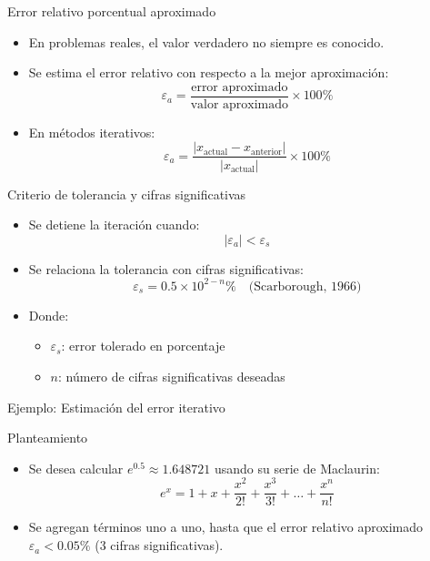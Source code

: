 \documentclass[main.tex]{subfiles}
\begin{document}
\begin{frame}[c]{Error relativo porcentual aproximado}
\begin{itemize}
  \item En problemas reales, el valor verdadero no siempre es conocido.
  \item Se estima el error relativo con respecto a la mejor aproximación:
  \[
\boxed{  \varepsilon_a = \frac{\text{error aproximado}}{\text{valor aproximado}} \times 100\%}
  \]
  \item En métodos iterativos:
  \[
\boxed{\varepsilon_a = \frac{|x_{\text{actual}} - x_{\text{anterior}}|}{|x_{\text{actual}}|} \times 100\%}
  \]
\end{itemize}
\end{frame}

\begin{frame}[c]{Criterio de tolerancia y cifras significativas}
\begin{itemize}
  \item Se detiene la iteración cuando:
  \[
\boxed{  |\varepsilon_a| < \varepsilon_s}
  \]
  \item Se relaciona la tolerancia con cifras significativas:
  \[
  \boxed{ \varepsilon_s = 0.5 \times 10^{2 - n}\%} \quad \text{(Scarborough, 1966)}
  \]
  \item Donde:
  \begin{itemize}
    \item \(\varepsilon_s\): error tolerado en porcentaje
    \item \(n\): número de cifras significativas deseadas
  \end{itemize}
\end{itemize}
\end{frame}

\begin{frame}[c]{Ejemplo:  Estimación del error iterativo}
\begin{block}{Planteamiento}
\begin{itemize}
  \item Se desea calcular \( e^{0.5} \approx 1.648721\) usando su serie de Maclaurin:
  \[
  e^x = 1 + x + \frac{x^2}{2!} + \frac{x^3}{3!} + \dots + \frac{x^n}{n!}
  \]
  \item Se agregan términos uno a uno, hasta que el error relativo aproximado \(\varepsilon_a < 0.05\%\) (3 cifras significativas).
\end{itemize}
\end{block}
\end{frame}
\end{document}
